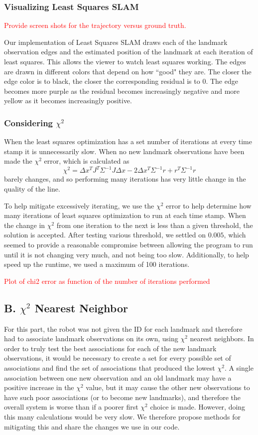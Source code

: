 \documentclass[12pt]{article}
\begin{document}
\subsubsection*{Visualizing Least Squares SLAM}
\textcolor{red}{Provide screen shots for the trajectory versus ground truth.}

Our implementation of Least Squares SLAM draws each of the landmark observation edges and the estimated position of the landmark at each iteration of least squares.  This allows the viewer to watch least squares working. The edges are drawn in different colors that depend on how ``good" they are.  The closer the edge color is to black, the closer the corresponding residual is to 0.  The edge becomes more purple as the residual becomes increasingly negative and more yellow as it becomes increasingly positive.

\subsubsection*{Considering $\chi^2$}
When the least squares optimization has a set number of iterations at every time stamp it is unnecessarily slow.  When no new landmark observations have been made the $\chi^2$ error, which is calculated as
$$\chi^2 = \Delta x^TJ^T\Sigma^{-1}J\Delta x - 2\Delta x^T\Sigma^{-1}r + r^T\Sigma^{-1}r$$
barely changes, and so performing many iterations has very little change in the quality of the line.

To help mitigate excessively iterating, we use the $\chi^2$ error to help determine how many iterations of least squares optimization to run at each time stamp.  When the change in $\chi^2$ from one iteration to the next is less than a given threshold, the solution is accepted.  After testing various threshold, we settled on $0.005$, which seemed to provide a reasonable compromise between allowing the program to run until it is not changing very much, and not being too slow.  Additionally, to help speed up the runtime, we used a maximum of 100 iterations.

\textcolor{red}{Plot of chi2 error as function of the number of iterations performed}


\subsection*{B. $\chi^2$ Nearest Neighbor}

For this part, the robot was not given the ID for each landmark and therefore had to associate landmark observations on its own, using $\chi^2$ nearest neighbors.  In order to truly test the best associations for each of the new landmark observations, it would be necessary to create a set for every possible set of associations and find the set of associations that produced the lowest $\chi^2$.  A single association between one new observation and an old landmark may have a positive increase in the $\chi^2$ value, but it may cause the other new observations to have such poor associations (or to become new landmarks), and therefore the overall system is worse than if a poorer first $\chi^2$ choice is made.  However, doing this many calculations would be very slow.  We therefore propose methods for mitigating this and share the changes we use in our code.
\end{document}
